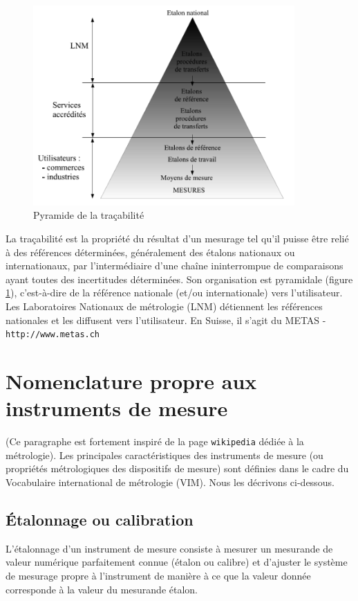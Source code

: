 \begin{figure}
    \centering
    \vspace{-5mm}
    \includegraphics[width=10cm]{assets/figures/pyramideTracabilite.pdf}
    \caption{Pyramide de la traçabilité}
    \label{fig:pyr}
\end{figure}
La traçabilité est la propriété du résultat d'un mesurage tel qu'il puisse être relié à des références déterminées, généralement des étalons nationaux ou internationaux, par l'intermédiaire d'une chaîne ininterrompue de comparaisons ayant toutes des incertitudes déterminées. Son organisation est pyramidale (figure \ref{fig:pyr}), c'est-à-dire de la référence nationale (et/ou internationale) vers l'utilisateur. Les Laboratoires Nationaux de métrologie (LNM) détiennent les références nationales et les diffusent vers l'utilisateur. En Suisse, il s'agit du METAS - \texttt{http://www.metas.ch}

\section{Nomenclature propre aux instruments de mesure}

 (Ce paragraphe est fortement inspiré de la page \texttt{wikipedia} dédiée à la métrologie). Les principales caractéristiques des instruments de mesure (ou propriétés métrologiques des dispositifs de mesure) sont définies dans le cadre du Vocabulaire international de métrologie (VIM). Nous les décrivons ci-dessous.

\subsection{Étalonnage ou calibration}

L'étalonnage d'un instrument de mesure consiste à mesurer un mesurande de valeur numérique parfaitement connue (étalon ou calibre) et d'ajuster le système de mesurage propre à l'instrument de manière à ce que la valeur donnée corresponde à la valeur du mesurande étalon.

